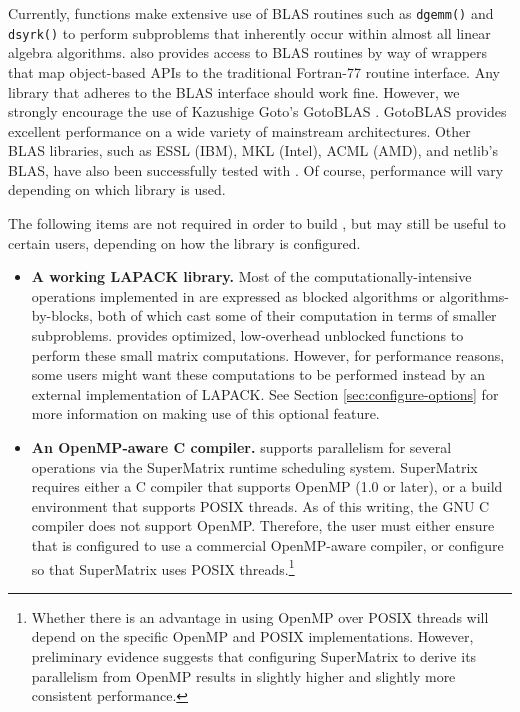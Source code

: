 \begin{itemize}
Currently, \libflame functions make extensive use of BLAS routines such as
{\tt dgemm()} and {\tt dsyrk()} to perform subproblems that inherently
occur within almost all linear algebra algorithms.
\libflame also provides access to BLAS routines by way of wrappers that map
object-based APIs to the traditional Fortran-77 routine interface.
Any library that adheres to the BLAS interface should work fine.
However, we strongly encourage the use of Kazushige Goto's GotoBLAS
\cite{Goto,Goto:2008:AHP,taccsoftware2008}.
GotoBLAS provides excellent performance on a wide variety of mainstream
architectures.
Other BLAS libraries, such as ESSL (IBM), MKL (Intel), ACML (AMD),
and netlib's BLAS, have also been successfully tested with \libflamens.
Of course, performance will vary depending on which library is used. 
\end{itemize}
The following items are not required in order to build \libflamens, but may
still be useful to certain users, depending on how the library is
configured.
\begin{itemize}
\item
{\bf A working LAPACK library.}
Most of the computationally-intensive operations implemented in \libflame
are expressed as blocked algorithms or algorithms-by-blocks, both of which
cast some of their computation in terms of smaller subproblems.
\libflame provides optimized, low-overhead unblocked functions to perform
these small matrix computations.
However, for performance reasons, some users might want these computations
to be performed instead by an external implementation of LAPACK.
See Section \ref{sec:configure-options} for more information on making use of
this optional feature.
\item
{\bf An OpenMP-aware C compiler.}
\libflame supports parallelism for several operations via the SuperMatrix
runtime scheduling system.
SuperMatrix requires either a C compiler that supports OpenMP (1.0 or later),
or a build environment that supports POSIX threads.
As of this writing, the GNU C compiler does not support OpenMP.
Therefore, the user must either ensure that \libflame is configured to use a
commercial OpenMP-aware compiler, or configure \libflame so that SuperMatrix
uses POSIX threads.\footnote{Whether there is an advantage in using OpenMP
over POSIX threads will depend on the specific OpenMP and POSIX
implementations.
However, preliminary evidence suggests that configuring SuperMatrix to derive
its parallelism from OpenMP results in slightly higher and slightly more
consistent performance.}
\end{itemize}

